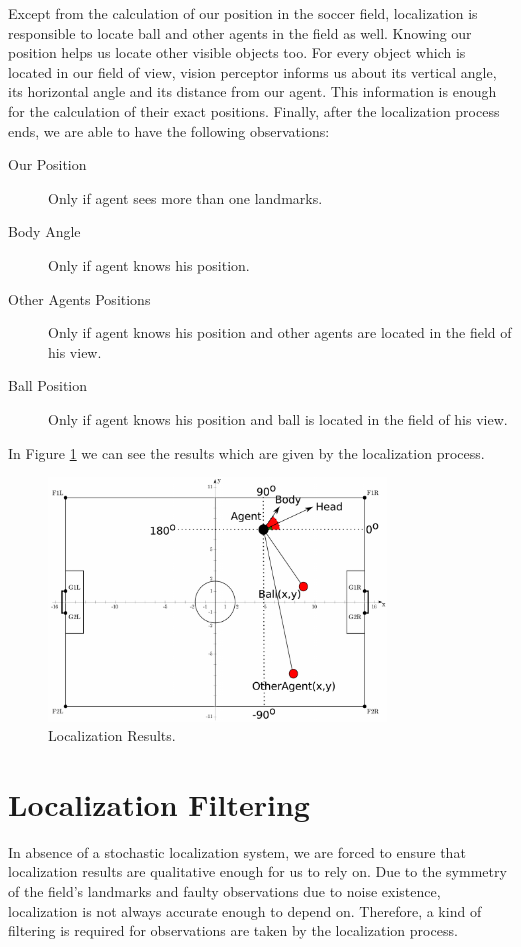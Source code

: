 Except from the calculation of our position in the soccer field, localization is responsible to locate ball and other agents in the field as well. Knowing our position helps us locate other visible objects too. For every object which is located in our field of view, vision perceptor informs us about its vertical angle, its horizontal angle and its distance from our agent. This information is enough for the calculation of their exact positions. Finally, after the localization process ends, we are able to have the following observations:

\begin{description}
	\item[Our Position] Only if agent sees more than one landmarks.
	\item[Body Angle] Only if agent knows his position.
	\item[Other Agents Positions]	Only if agent knows his position and other agents are located in the field of his view.
	\item[Ball Position] Only if agent knows his position and ball is located in the field of his view.
\end{description}
In Figure \ref{fig:LocalizationResults} we can see the results which are given by the localization process.

\begin{figure}[t!]
\centering
  \includegraphics[width=0.8\textwidth]{Chapter3/figures/LocalizationResults.pdf}
  \caption{Localization Results.} 
  \label{fig:LocalizationResults}
\end{figure}
\hfill





\section{Localization Filtering}
In absence of a stochastic localization system, we are forced to ensure that localization results are qualitative enough for us to rely on. Due to the symmetry of the field's landmarks and faulty observations due to noise existence, localization is not always accurate enough to depend on. Therefore, a kind of filtering is required for  observations are taken by the localization process.

